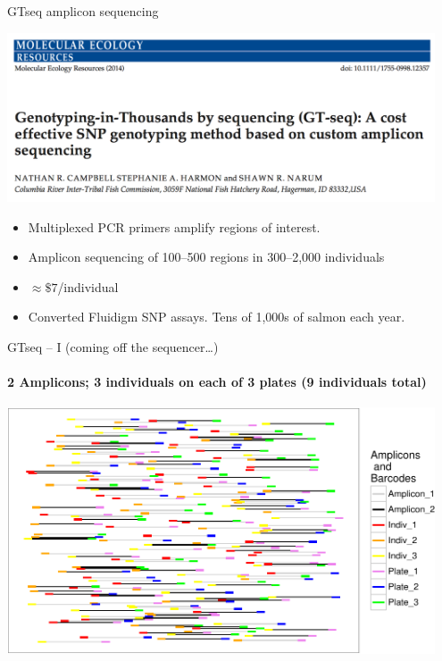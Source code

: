 \documentclass[letter,graphicx]{beamer}
\begin{document}
\begin{frame}{GTseq amplicon sequencing}
\begin{center}
\includegraphics[width=0.95\textwidth]{figs/gtseq-header.png}
\end{center}
\begin{itemize}
\item Multiplexed PCR primers amplify regions of interest.
\item Amplicon sequencing of 100--500 regions in 300--2,000 individuals
\item $\approx \$7$/individual
\item Converted Fluidigm SNP assays.  Tens of 1,000s of salmon each year.
\end{itemize}
\end{frame}








\begin{frame}{GTseq -- I {\small (coming off the sequencer\ldots)}}
\framesubtitle{2 Amplicons; 3 individuals on each of 3 plates (9 individuals total)}
\begin{center}
\includegraphics[width=0.95\textwidth]{figs/gtseq-soup-crop.pdf}
\end{center}
\end{frame}
\end{document}
